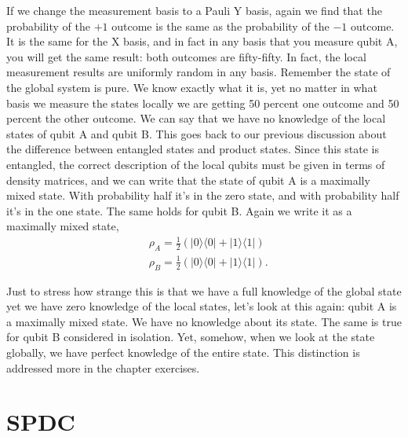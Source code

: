 
If we change the measurement basis to a Pauli Y basis, again we find that the probability of the $+1$ outcome is the same as the probability of the $-1$ outcome. It is the same for the X basis, and in fact in any basis that you measure qubit A, you will get the same result: both outcomes are fifty-fifty. In fact, the local measurement results are uniformly random in any basis. Remember the state of the global system is pure. We know exactly what it is, yet no matter in what basis we measure the states locally we are getting 50 percent one outcome and 50 percent the other outcome. We can say that we have no knowledge of the local states of qubit A and qubit B. This goes back to our previous discussion about the difference between entangled states and product states.  Since this state is entangled, the correct description of the local qubits must be given in terms of density matrices, and we can write that the state of qubit A is a maximally mixed state. With probability half it's in the zero state, and with probability half it's in the one state. The same holds for qubit B. Again we write it as a maximally mixed state,
\begin{equation}
\begin{aligned}
&\rho_A=\frac{1}{2}(|0\rangle\langle 0|+| 1\rangle\langle 1|) \\
&\rho_B=\frac{1}{2}(|0\rangle\langle 0|+| 1\rangle\langle 1|).
\end{aligned}
\end{equation}

Just to stress how strange this is that we have a full knowledge of the global state yet we have zero knowledge of the local states, let's look at this again: qubit A is a maximally mixed state. We have no knowledge about its state. The same is true for qubit B considered in isolation. Yet, somehow, when we look at the state globally, we have perfect knowledge of the entire state. This distinction is addressed more in the chapter exercises.


\section{SPDC}
\label{sec:4-4_spdc}

